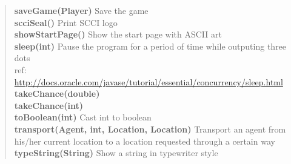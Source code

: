 {{{\begin{verse}
{\bf saveGame(Player)} Save the game\\
{\bf scciSeal()} Print SCCI logo\\
{\bf showStartPage()} Show the start page with ASCII art\\
{\bf sleep(int)} Pause the program for a period of time while outputing three dots \\ref: \url{http://docs.oracle.com/javase/tutorial/essential/concurrency/sleep.html}\\
{\bf takeChance(double)} \\
{\bf takeChance(int)} \\
{\bf toBoolean(int)} Cast int to boolean\\
{\bf transport(Agent, int, Location, Location)} Transport an agent from his/her current location to a location requested through a certain way\\
{\bf typeString(String)} Show a string in typewriter style\\
\end{verse}
}
}}
